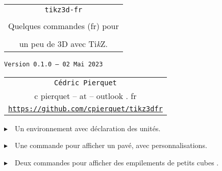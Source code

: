 \documentclass[french,a4paper,11pt]{article}
\def\TPversion{0.1.0}
\def\TPdate{02 Mai 2023}
\providecommand\tikzlogo{Ti\textit{k}Z}
\let\TikZ\tikzlogo
\begin{document}
\setlength{\aweboxleftmargin}{0.07\linewidth}
\setlength{\aweboxcontentwidth}{0.93\linewidth}
\setlength{\aweboxvskip}{8pt}

\pagestyle{fancy}

\thispagestyle{empty}

\vspace{2cm}

\begin{center}
	\begin{minipage}{0.75\linewidth}
	\begin{tcolorbox}[colframe=yellow,colback=yellow!15]
		\begin{center}
			\begin{tabular}{c}
				{\Huge \texttt{tikz3d-fr}}\\
				\\
				{\LARGE Quelques commandes (fr) pour} \\
				\\
				{\LARGE un peu de 3D avec \TikZ.} \\
			\end{tabular}
			
			\bigskip
			
			{\small \texttt{Version \TPversion{} -- \TPdate}}
		\end{center}
	\end{tcolorbox}
\end{minipage}
\end{center}

\begin{center}
	\begin{tabular}{c}
	\texttt{Cédric Pierquet}\\
	{\ttfamily c pierquet -- at -- outlook . fr}\\
	\texttt{\url{https://github.com/cpierquet/tikz3dfr}}
\end{tabular}
\end{center}

\vspace{0.25cm}

{$\blacktriangleright$~~Un environnement avec déclaration des unités.}

\smallskip

{$\blacktriangleright$~~Une commande pour afficher un pavé, avec personnalisations.}

\smallskip

{$\blacktriangleright$~~Deux commandes pour afficher des empilements de \og petits cubes \fg.}

\vspace{1cm}
\end{document}
